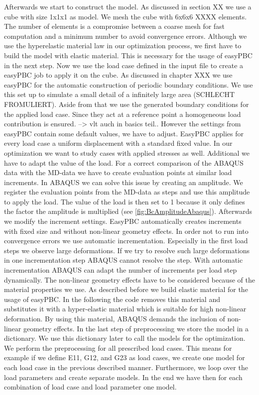     Afterwards we start to construct the model. As discussed in section XX we use a cube with size 1x1x1 as model. We mesh the cube with 6x6x6 XXXX elements. The number of elements is a compromise between a coarse mesh for fast computation and a minimum number to avoid convergence errors. Although we use the hyperelastic material law in our optimization process, we first have to build the model with elastic material. This is necessary for the usage of easyPBC in the next step. Now we use the load case defined in the input file to create a easyPBC job to apply it on the cube. As discussed in chapter XXX we use easyPBC for the automatic construction of periodic boundary conditions. We use this set up to simulate a small detail of a infinitely large area (SCHLECHT FROMULIERT). Aside from that we use the generated boundary conditions for the applied load case. Since they act at a reference point a homogeneous load contribution is ensured. --> vlt auch in basics teil..
    However the settings from easyPBC contain some default values, we have to adjust. EasyPBC applies for every load case a uniform displacement with a standard fixed value. In our optimization we want to study cases with applied stresses as well. Additional we have to adapt the value of the load. For a correct comparison of the ABAQUS data with the MD-data we have to create evaluation points at similar load increments. In ABAQUS we can solve this issue by creating an amplitude. We register the evaluation points from the MD-data as steps and use this amplitude to apply the load. The value of the load is then set to 1 because it only defines the factor the amplitude is multiplied (see \autoref{fig:BcAmplitudeAbaqus}). Afterwards we modify the increment settings. EasyPBC automatically creates increments with fixed size and without non-linear geometry effects. In order not to run into convergence errors we use automatic incrementation. Especially in the first load steps we observe large deformations. If we try to resolve such large deformations in one incrementation step ABAQUS cannot resolve the step. With automatic incrementation ABAQUS can adapt the number of increments per load step dynamically. The non-linear geometry effects have to be considered because of the material properties we use. As described before we build elastic material for the usage of easyPBC. In the following the code removes this material and substitutes it with a hyper-elastic material which is suitable for high non-linear deformation. By using this material, ABAQUS demands the inclusion of non-linear geometry effects. In the last step of preprocessing we store the model in a dictionary. We use this dictionary later to call the models for the optimization. We perform the preprocessing for all prescribed load cases. This means for example if we define E11, G12, and G23 as load cases, we create one model for each load case in the previous described manner. Furthermore, we loop over the load parameters and create separate models. In the end we have then for each combination of load case and load parameter one model. 

